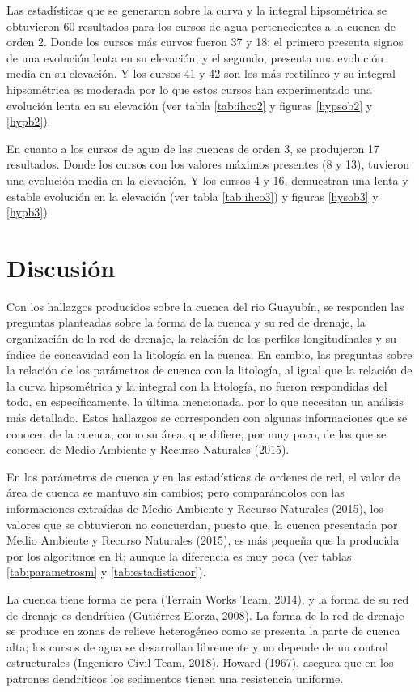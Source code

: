 \documentclass[11pt,]{article}
\begin{document}
Las estadísticas que se generaron sobre la curva y la integral
hipsométrica se obtuvieron 60 resultados para los cursos de agua
pertenecientes a la cuenca de orden 2. Donde los cursos más curvos
fueron 37 y 18; el primero presenta signos de una evolución lenta en su
elevación; y el segundo, presenta una evolución media en su elevación. Y
los cursos 41 y 42 son los más rectilíneo y su integral hipsométrica es
moderada por lo que estos cursos han experimentado una evolución lenta
en su elevación (ver tabla \ref{tab:ihco2} y figuras \ref{hypsob2} y
\ref{hypb2}).

En cuanto a los cursos de agua de las cuencas de orden 3, se produjeron
17 resultados. Donde los cursos con los valores máximos presentes (8 y
13), tuvieron una evolución media en la elevación. Y los cursos 4 y 16,
demuestran una lenta y estable evolución en la elevación (ver tabla
\ref{tab:ihco3}) y figuras \ref{hysob3} y \ref{hypb3}).

\section{Discusión}\label{discusiuxf3n}

Con los hallazgos producidos sobre la cuenca del rio Guayubín, se
responden las preguntas planteadas sobre la forma de la cuenca y su red
de drenaje, la organización de la red de drenaje, la relación de los
perfiles longitudinales y su índice de concavidad con la litología en la
cuenca. En cambio, las preguntas sobre la relación de los parámetros de
cuenca con la litología, al igual que la relación de la curva
hipsométrica y la integral con la litología, no fueron respondidas del
todo, en específicamente, la última mencionada, por lo que necesitan un
análisis más detallado. Estos hallazgos se corresponden con algunas
informaciones que se conocen de la cuenca, como su área, que difiere,
por muy poco, de los que se conocen de Medio Ambiente y Recurso
Naturales (2015).

En los parámetros de cuenca y en las estadísticas de ordenes de red, el
valor de área de cuenca se mantuvo sin cambios; pero comparándolos con
las informaciones extraídas de Medio Ambiente y Recurso Naturales
(2015), los valores que se obtuvieron no concuerdan, puesto que, la
cuenca presentada por Medio Ambiente y Recurso Naturales (2015), es más
pequeña que la producida por los algoritmos en R; aunque la diferencia
es muy poca (ver tablas \ref{tab:parametrosm} y
\ref{tab:estadisticaor}).

La cuenca tiene forma de pera (Terrain Works Team, 2014), y la forma de
su red de drenaje es dendrítica (Gutiérrez Elorza, 2008). La forma de la
red de drenaje se produce en zonas de relieve heterogéneo como se
presenta la parte de cuenca alta; los cursos de agua se desarrollan
libremente y no depende de un control estructurales (Ingeniero Civil
Team, 2018). Howard (1967), asegura que en los patrones dendríticos los
sedimentos tienen una resistencia uniforme.
\end{document}
